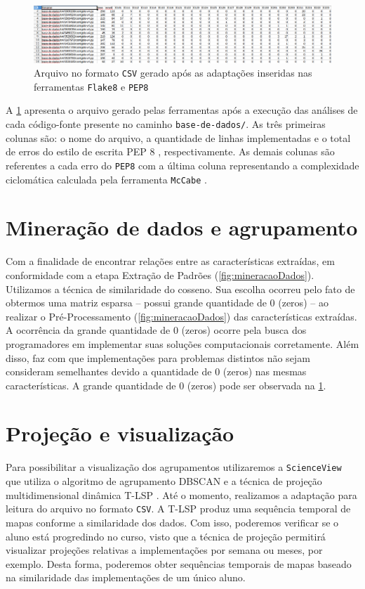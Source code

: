 		\begin{figure}[h]
			\centering
			\includegraphics[width=1\linewidth]{imagem/arquivoCSV}
			\caption{Arquivo no formato \texttt{CSV} gerado após as adaptações inseridas nas ferramentas \texttt{Flake8} e \texttt{PEP8}}
			\label{fig:arquivoCSV}
		\end{figure}
		
		A \cref{fig:arquivoCSV} apresenta o arquivo gerado pelas ferramentas após a
		execução das análises de cada código-fonte presente no caminho \texttt{base-de-dados/}.
		As três primeiras colunas são: o nome do arquivo, a quantidade de linhas implementadas
		e o total de erros do estilo de escrita PEP 8 \cite{van2001pep}, respectivamente. As
		demais colunas são referentes a cada erro do \texttt{PEP8} \cite{pep8} com a última
		coluna representando a complexidade ciclomática calculada pela ferramenta
		\texttt{McCabe} \cite{mccabe}.

	\section{Mineração de dados e agrupamento}
		Com a finalidade de encontrar relações entre as características extraídas, em
		conformidade com a etapa Extração de Padrões (\cref{fig:mineracaoDados}).
		Utilizamos a técnica de similaridade do cosseno. Sua escolha ocorreu pelo fato de obtermos
		uma matriz esparsa -- possui grande quantidade de 0 (zeros) -- ao realizar o
		Pré-Processamento (\cref{fig:mineracaoDados}) das características extraídas. A
		ocorrência da grande quantidade de 0 (zeros) ocorre pela busca dos programadores
		em implementar suas soluções computacionais corretamente. Além disso, faz com que
		implementações para problemas distintos não sejam consideram semelhantes devido a
		quantidade de 0 (zeros) nas mesmas características. A grande quantidade de 0 (zeros)
		pode ser observada na \cref{fig:arquivoCSV}.
	
	\section{Projeção e visualização}
		Para possibilitar a visualização dos agrupamentos utilizaremos a \texttt{ScienceView}
		\cite{Alencar-etal:2012} que utiliza o algoritmo de agrupamento \acs{DBSCAN} \cite{Ester1996}
		e a técnica de projeção multidimensional dinâmica \ac{T-LSP} \cite{Alencar}. Até o momento,
		realizamos a adaptação para leitura do arquivo no formato \texttt{CSV}. A \acs{T-LSP} \cite{Alencar}
		produz uma sequência temporal de mapas conforme a similaridade dos dados. Com isso, poderemos
		verificar se o aluno está progredindo no curso, visto que a técnica de projeção permitirá
		visualizar projeções relativas a implementações por semana ou meses, por exemplo. Desta
		forma, poderemos obter sequências temporais de mapas baseado na similaridade das
		implementações de um único aluno.
		
